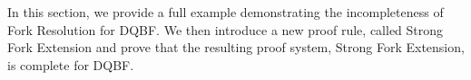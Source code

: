 \documentclass{svjour3}
\newcommand{\ldot}{\mathpunct{.}}
\newcommand{\dep}{\mathit{dep}}
\begin{document}
In this section, we provide a full example demonstrating the incompleteness of Fork Resolution for DQBF.
We then introduce a new proof rule, called Strong Fork Extension and prove that the resulting proof system, Strong Fork Extension, is complete for DQBF.

\end{document}

